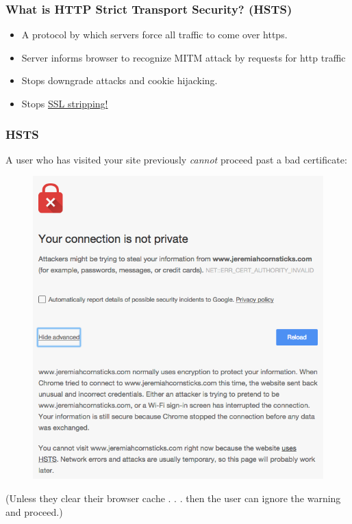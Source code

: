 \documentclass[9pt]{beamer}
\begin{document}
\begin{frame}[fragile]
\frametitle{What is HTTP Strict Transport Security? (HSTS)}
\begin{itemize}
\item A protocol by which servers force all traffic to come over https.
\pause
\item Server informs browser to recognize MITM attack by requests for http traffic
\pause
\item Stops downgrade attacks and cookie hijacking.
\pause
\item Stops \href{http://www.thoughtcrime.org/software/sslstrip/}{SSL stripping!}
\end{itemize}
\end{frame}

\begin{frame}[fragile]
\frametitle{HSTS}
A user who has visited your site previously \emph{cannot} proceed past a bad certificate:
\begin{figure}
\includegraphics[scale=0.25]{figures/HSTSNoRedirect.png}
\end{figure}
\pause
(Unless they clear their browser cache . . . then the user can ignore the warning and proceed.)
\end{frame}
\end{document}

